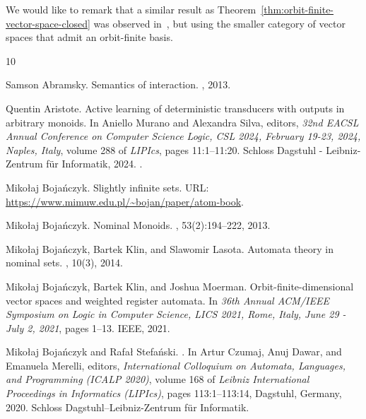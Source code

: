\documentclass[10pt,a4paper]{amsart}
\numberwithin{equation}{section}
\theoremstyle{plain}
\begin{document}
    We would like to remark that a similar result as Theorem~\ref{thm:orbit-finite-vector-space-closed} was observed in~\cite[Theorem 3.8]{przybyłek2024note}, but using the smaller category of vector spaces that admit an orbit-finite basis. 

\begin{thebibliography}{10}

Samson Abramsky.
\newblock Semantics of interaction.
, 2013.

Quentin Aristote.
\newblock Active learning of deterministic transducers with outputs in
  arbitrary monoids.
\newblock In Aniello Murano and Alexandra Silva, editors, {\em 32nd {EACSL}
  Annual Conference on Computer Science Logic, {CSL} 2024, February 19-23,
  2024, Naples, Italy}, volume 288 of {\em LIPIcs}, pages 11:1--11:20. Schloss
  Dagstuhl - Leibniz-Zentrum f{\"{u}}r Informatik, 2024.
\newblock \href {https://doi.org/10.4230/LIPICS.CSL.2024.11}
  {}.

Miko{\l}aj Boja\'nczyk.
\newblock Slightly infinite sets.
\newblock URL: \url{https://www.mimuw.edu.pl/~bojan/paper/atom-book}.

Miko{\l}aj Boja\'nczyk.
\newblock Nominal {{Monoids}}.
, 53(2):194--222, 2013.

Miko{\l}aj Boja\'nczyk, Bartek Klin, and Slawomir Lasota.
\newblock Automata theory in nominal sets.
, 10(3), 2014.

Miko{\l}aj Boja\'nczyk, Bartek Klin, and Joshua Moerman.
\newblock Orbit-finite-dimensional vector spaces and weighted register
  automata.
\newblock In {\em 36th Annual {ACM/IEEE} Symposium on Logic in Computer
  Science, {LICS} 2021, Rome, Italy, June 29 - July 2, 2021}, pages 1--13.
  {IEEE}, 2021.

Miko{\l}aj Boja{\'n}czyk and Rafa{\l} Stefa{\'n}ski.
.
\newblock In Artur Czumaj, Anuj Dawar, and Emanuela Merelli, editors, {\em
  International Colloquium on Automata, Languages, and Programming (ICALP
  2020)}, volume 168 of {\em Leibniz International Proceedings in Informatics
  (LIPIcs)}, pages 113:1--113:14, Dagstuhl, Germany, 2020. Schloss
  Dagstuhl--Leibniz-Zentrum f{\"u}r Informatik.


\end{thebibliography}
\end{document}
